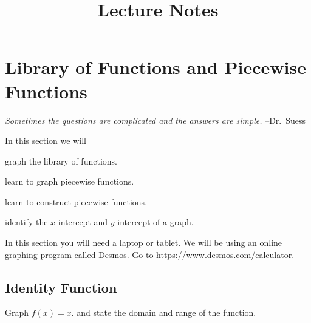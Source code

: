 \documentclass[oneside,10pt]{book}
\title{Lecture Notes}
\begin{document}
\setcounter{chapter}{3}
\setcounter{section}{3}

\section{Library of Functions and Piecewise Functions}


\textit{Sometimes the questions are complicated and the answers are simple.}
--Dr.~Suess


\begin{objectives}
{In this section we will}
  \item
    graph the library of functions.
  \item
    learn to graph piecewise functions.
  \item
    learn to construct piecewise functions.
  \item
    identify the $x$-intercept and $y$-intercept of a graph.
\end{objectives}







In this section you will need a laptop or tablet. We will be using an online
graphing program called \href{https://www.desmos.com/calculator}{Desmos}. Go to
\url{https://www.desmos.com/calculator}.


\subsection{Identity Function}


\example
Graph
$f(x) = x$.
and state the domain and range of the function.
\vspace{0.5em}
\end{document}
